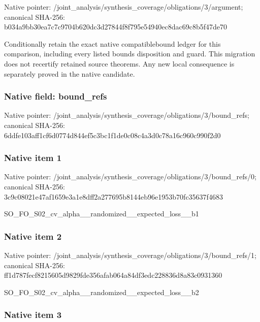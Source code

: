 \documentclass[10pt,a4paper]{article}
\begin{document}
Native pointer: /joint\_analysis/synthesi\allowbreak{}s\_coverage/obligations/3\allowbreak{}/argument; canonical SHA-256: b034a9bb30ea7c7c9704b620\allowbreak{}dc3d27844f8f795e54940ec8\allowbreak{}dac69c8b5f47de70


Conditionally retain the exact native compatiblebound ledger for this comparison, including every listed bounds disposition and guard. This migration does not recertify retained source theorems. Any new local consequence is separately proved in the native candidate.


\subsubsection{Native field: bound\_refs}


Native pointer: /joint\_analysis/synthesi\allowbreak{}s\_coverage/obligations/3\allowbreak{}/bound\_refs; canonical SHA-256: 6ddfe103aff1cf6d0774d844\allowbreak{}ef5c3bc1f1de0c08c4a3d0c7\allowbreak{}8a16c960c990f2d0



\subsubsection{Native item 1}


Native pointer: /joint\_analysis/synthesi\allowbreak{}s\_coverage/obligations/3\allowbreak{}/bound\_refs/0; canonical SHA-256: 3c9c08021e47af1659e3a1e8\allowbreak{}dff2a277695b8144eb96e195\allowbreak{}3b70fc35637f4683


SO\_FO\_S02\_cv\_alpha\_\_rand\allowbreak{}omized\_\_expected\_loss\_\_b\allowbreak{}1


\subsubsection{Native item 2}


Native pointer: /joint\_analysis/synthesi\allowbreak{}s\_coverage/obligations/3\allowbreak{}/bound\_refs/1; canonical SHA-256: ff1d787fecf8215605d9829f\allowbreak{}de356afab064a84df3edc228\allowbreak{}836d8a83c0931360


SO\_FO\_S02\_cv\_alpha\_\_rand\allowbreak{}omized\_\_expected\_loss\_\_b\allowbreak{}2


\subsubsection{Native item 3}
\end{document}
